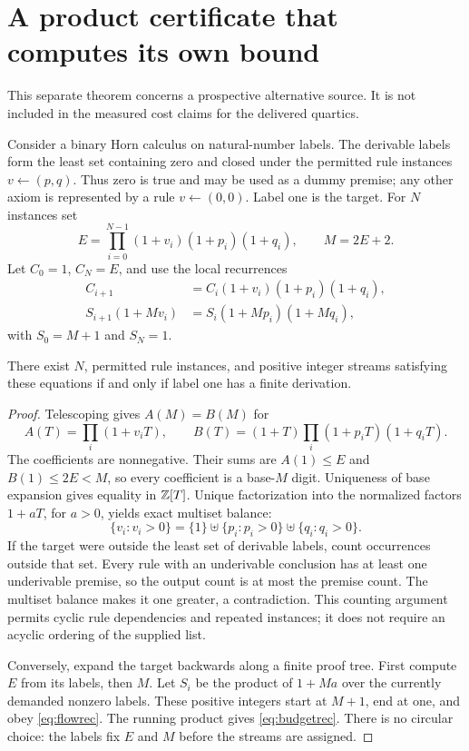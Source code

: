 \section{A product certificate that computes its own bound}\label{sec:budget}
This separate theorem concerns a prospective alternative source. It is
not included in the measured cost claims for the delivered quartics.

Consider a binary Horn calculus on natural-number labels. The derivable
labels form the least set containing zero and closed under the permitted
rule instances $v\leftarrow(p,q)$. Thus zero is true and may be used as a
dummy premise; any other axiom is represented by a rule
$v\leftarrow(0,0)$. Label one is the target. For $N$ instances set
\[
 E=\prod_{i=0}^{N-1}(1+v_i)(1+p_i)(1+q_i),\qquad M=2E+2.
\]
Let $C_0=1$, $C_N=E$, and use the local recurrences
\begin{align}
 C_{i+1}&=C_i(1+v_i)(1+p_i)(1+q_i),\label{eq:budgetrec}\\
 S_{i+1}(1+Mv_i)&=S_i(1+Mp_i)(1+Mq_i),\label{eq:flowrec}
\end{align}
with $S_0=M+1$ and $S_N=1$.

\begin{theorem}
There exist $N$, permitted rule instances, and positive integer streams
satisfying these equations if and only if label one has a finite derivation.
\end{theorem}
\begin{proof}
Telescoping gives $A(M)=B(M)$ for
\[
 A(T)=\prod_i(1+v_iT),\qquad
 B(T)=(1+T)\prod_i(1+p_iT)(1+q_iT).
\]
The coefficients are nonnegative. Their sums are $A(1)\le E$ and
$B(1)\le2E<M$, so every coefficient is a base-$M$ digit. Uniqueness of
base expansion gives equality in $\mathbb Z[T]$. Unique factorization into
the normalized factors $1+aT$, for $a>0$, yields exact multiset balance:
\[
 \{v_i:v_i>0\}
 =\{1\}\mathbin{\uplus}\{p_i:p_i>0\}
          \mathbin{\uplus}\{q_i:q_i>0\}.
\]
If the target were outside the least set of derivable labels, count
occurrences outside that set. Every rule with an underivable conclusion
has at least one underivable premise, so the output count is at most
the premise count. The multiset balance makes it one greater, a contradiction.
This counting argument permits cyclic rule dependencies and repeated
instances; it does not require an acyclic ordering of the supplied list.

Conversely, expand the target backwards along a finite proof tree. First
compute $E$ from its labels, then $M$. Let $S_i$ be the product of $1+Ma$
over the currently demanded nonzero labels. These positive integers start
at $M+1$, end at one, and obey \eqref{eq:flowrec}. The running product
gives \eqref{eq:budgetrec}. There is no circular choice: the labels fix
$E$ and $M$ before the streams are assigned.
\end{proof}


